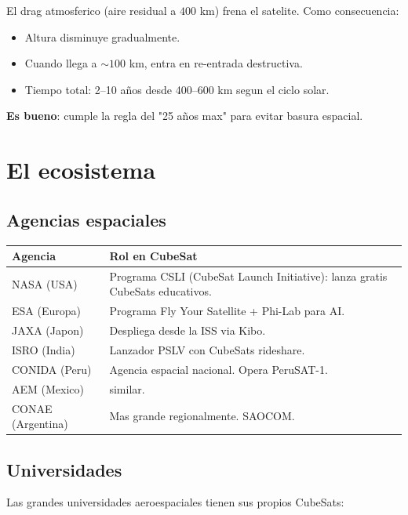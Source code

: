 \documentclass[11pt,a4paper,oneside,openright]{book}
\begin{document}
El drag atmosferico (aire residual a $400$ km) frena el satelite. Como
consecuencia:
\begin{itemize}[leftmargin=2em]
  \item Altura disminuye gradualmente.
  \item Cuando llega a $\sim 100$ km, entra en re-entrada destructiva.
  \item Tiempo total: 2--10 años desde 400--600 km segun el ciclo solar.
\end{itemize}

\textbf{Es bueno}: cumple la regla del "25 años max" para evitar basura
espacial.

\chapter{El ecosistema}
\label{ch:ecosistema}

\section{Agencias espaciales}

\begin{center}
\begin{tabular}{lp{10cm}}
\toprule
\textbf{Agencia} & \textbf{Rol en CubeSat} \\
\midrule
NASA (USA)         & Programa CSLI (CubeSat Launch Initiative): lanza
                     gratis CubeSats educativos. \\
ESA (Europa)       & Programa Fly Your Satellite + Phi-Lab para AI. \\
JAXA (Japon)       & Despliega desde la ISS via Kibo. \\
ISRO (India)       & Lanzador PSLV con CubeSats rideshare. \\
CONIDA (Peru)      & Agencia espacial nacional. Opera PeruSAT-1. \\
AEM (Mexico)       & similar. \\
CONAE (Argentina)  & Mas grande regionalmente. SAOCOM. \\
\bottomrule
\end{tabular}
\end{center}

\section{Universidades}

Las grandes universidades aeroespaciales tienen sus propios CubeSats:
\end{document}

